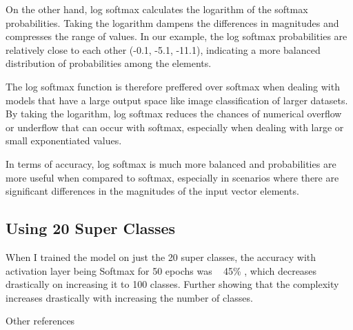 \documentclass{article}
\begin{document}
On the other hand, log softmax calculates the logarithm of the softmax probabilities. Taking the logarithm dampens the differences in magnitudes and compresses the range of values. In our example, the log softmax probabilities are relatively close to each other (-0.1, -5.1, -11.1), indicating a more balanced distribution of probabilities among the elements.

The log softmax function is therefore preffered over softmax when dealing with models that have a large output space like image classification of larger datasets. By taking the logarithm, log softmax reduces the chances of numerical overflow or underflow that can occur with softmax, especially when dealing with large or small exponentiated values.

In terms of accuracy, log softmax is much more balanced and probabilities are more useful when compared to softmax, especially in scenarios where there are significant differences in the magnitudes of the input vector elements.

\subsection{Using 20 Super Classes}

When I trained the model on just the 20 super classes, the accuracy with activation layer being Softmax for 50 epochs was ~ 45\% , which decreases drastically on increasing it to 100 classes. Further showing that the complexity increases drastically with increasing the number of classes.

\vspace{6pt}
\vspace{6pt}

Other references
\cite{cifar100}
\cite{fast-softmax-sampling} \cite{maddison2017concrete} \cite{alitabakds_my-first-project_2023}



\end{document}
